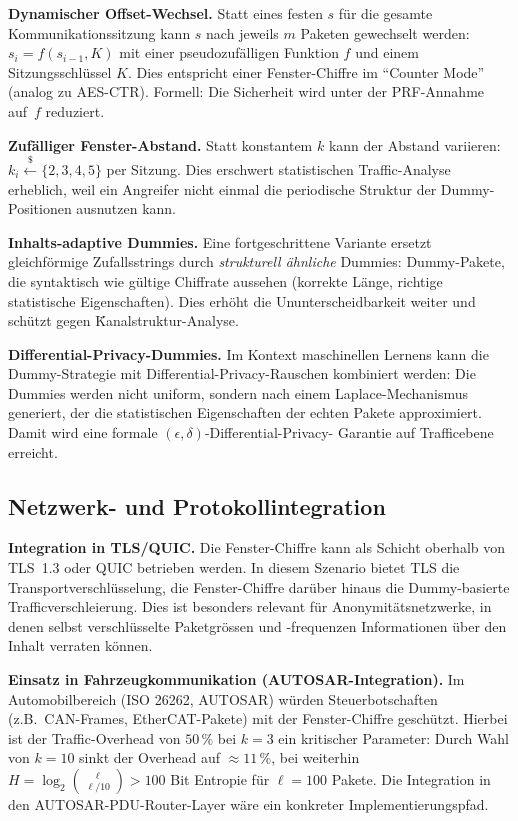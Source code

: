 ﻿\documentclass[12pt, a4paper]{article}
\theoremstyle{plain}
\theoremstyle{definition}
\theoremstyle{remark}
\begin{document}
\textbf{Dynamischer Offset-Wechsel.}
Statt eines festen $s$ f\"ur die gesamte Kommunikationssitzung kann $s$
nach jeweils $m$ Paketen gewechselt werden: $s_i = f(s_{i-1}, K)$ mit
einer pseudozuf\"alligen Funktion $f$ und einem Sitzungsschl\"ussel $K$.
Dies entspricht einer Fenster-Chiffre im ``Counter Mode'' (analog zu AES-CTR).
Formell: Die Sicherheit wird unter der PRF-Annahme auf~$f$ reduziert.

\textbf{Zuf\"alliger Fenster-Abstand.}
Statt konstantem $k$ kann der Abstand variieren: $k_i \xleftarrow{\$} \{2, 3, 4, 5\}$
per Sitzung. Dies erschwert statistischen Traffic-Analyse erheblich,
weil ein Angreifer nicht einmal die periodische Struktur der Dummy-Positionen
ausnutzen kann.

\textbf{Inhalts-adaptive Dummies.}
Eine fortgeschrittene Variante ersetzt gleichf\"ormige Zufallsstrings
durch \emph{strukturell \"ahnliche} Dummies: Dummy-Pakete, die syntaktisch
wie g\"ultige Chiffrate aussehen (korrekte L\"ange, richtige statistische
Eigenschaften). Dies erh\"oht die Ununterscheidbarkeit weiter und sch\"utzt
gegen \"Kanalstruktur-Analyse.

\textbf{Differential-Privacy-Dummies.}
Im Kontext maschinellen Lernens kann die Dummy-Strategie mit
Differential-Privacy-Rauschen \cite{dwork2014algorithmic} kombiniert werden:
Die Dummies werden nicht uniform, sondern nach einem Laplace-Mechanismus
generiert, der die statistischen Eigenschaften der echten Pakete
approximiert. Damit wird eine formale $(\epsilon,\delta)$-Differential-Privacy-
Garantie auf Trafficebene erreicht.

\subsection{Netzwerk- und Protokollintegration}

\textbf{Integration in TLS/QUIC.}
Die Fenster-Chiffre kann als Schicht oberhalb von TLS~1.3 oder QUIC
betrieben werden. In diesem Szenario bietet TLS die Transportverschl\"usselung,
die Fenster-Chiffre dar\"uber hinaus die Dummy-basierte Trafficverschleierung.
Dies ist besonders relevant f\"ur Anonymit\"atsnetzwerke, in denen selbst
verschl\"usselte Paketgr\"ossen und -frequenzen Informationen \"uber
den Inhalt verraten k\"onnen.

\textbf{Einsatz in Fahrzeugkommunikation (AUTOSAR-Integration).}
Im Automobilbereich (ISO 26262, AUTOSAR) w\"urden Steuerbotschaften
(z.B.\ CAN-Frames, EtherCAT-Pakete) mit der Fenster-Chiffre gesch\"utzt.
Hierbei ist der Traffic-Overhead von $50\,\%$ bei $k=3$ ein kritischer
Parameter: Durch Wahl von $k=10$ sinkt der Overhead auf $\approx 11\,\%$,
bei weiterhin $H = \log_2\binom{\ell}{\ell/10} > 100$ Bit Entropie f\"ur
$\ell = 100$ Pakete. Die Integration in den AUTOSAR-PDU-Router-Layer
w\"are ein konkreter Implementierungspfad.
\end{document}
